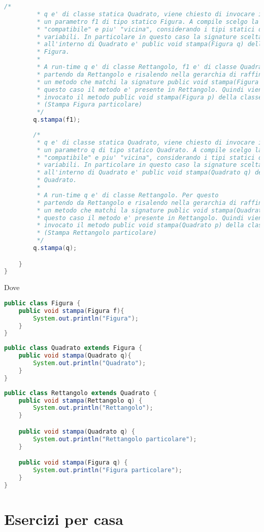 \documentclass{article}
\begin{document}
\begin{lstlisting}[language=Java,escapechar=|]
		/*
		 * q e' di classe statica Quadrato, viene chiesto di invocare il metodo stampa su
		 * un parametro f1 di tipo statico Figura. A compile scelgo la signature
		 * "compatibile" e piu' "vicina", considerando i tipi statici delle
		 * variabili. In particolare in questo caso la signature scelta
		 * all'interno di Quadrato e' public void stampa(Figura q) della classe
		 * Figura.
		 * 
		 * A run-time q e' di classe Rettangolo, f1 e' di classe Quadrato. Per questo
		 * partendo da Rettangolo e risalendo nella gerarchia di raffinamento cerco
		 * un metodo che matchi la signature public void stampa(Figura p). In
		 * questo caso il metodo e' presente in Rettangolo. Quindi viene
		 * invocato il metodo public void stampa(Figura p) della classe Rettangolo
		 * (Stampa Figura particolare)
		 */
		q.stampa(f1);
		
		/*
		 * q e' di classe statica Quadrato, viene chiesto di invocare il metodo stampa su
		 * un parametro q di tipo statico Quadrato. A compile scelgo la signature
		 * "compatibile" e piu' "vicina", considerando i tipi statici delle
		 * variabili. In particolare in questo caso la signature scelta
		 * all'interno di Quadrato e' public void stampa(Quadrato q) della classe
		 * Quadrato.
		 * 
		 * A run-time q e' di classe Rettangolo. Per questo
		 * partendo da Rettangolo e risalendo nella gerarchia di raffinamento cerco
		 * un metodo che matchi la signature public void stampa(Quadrato p). In
		 * questo caso il metodo e' presente in Rettangolo. Quindi viene
		 * invocato il metodo public void stampa(Quadrato p) della classe Rettangolo
		 * (Stampa Rettangolo particolare)
		 */
		q.stampa(q);

	}
}
\end{lstlisting}

Dove
\begin{lstlisting}[language=Java,escapechar=|]
public class Figura {
	public void stampa(Figura f){
		System.out.println("Figura");
	}
}
\end{lstlisting}
\begin{lstlisting}[language=Java,escapechar=|]
public class Quadrato extends Figura {
	public void stampa(Quadrato q){
		System.out.println("Quadrato");
	}
}
\end{lstlisting}
\begin{lstlisting}[language=Java,escapechar=|]
public class Rettangolo extends Quadrato {
	public void stampa(Rettangolo q) {
		System.out.println("Rettangolo");
	}

	public void stampa(Quadrato q) {
		System.out.println("Rettangolo particolare");
	}

	public void stampa(Figura q) {
		System.out.println("Figura particolare");
	}
}
\end{lstlisting}

\section{Esercizi per casa}




\clearpage







\nocite{*}
\end{document}
